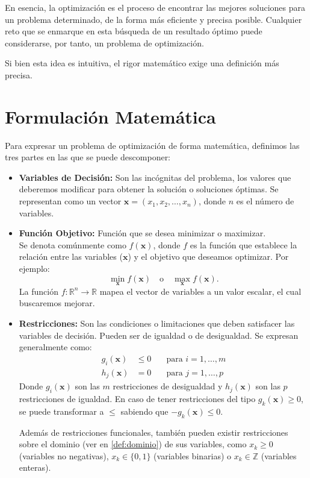 \documentclass[12pt,a4paper]{book}
\begin{document}
En esencia, la optimización es el proceso de encontrar las mejores soluciones para un problema determinado, de la forma más eficiente y precisa posible.
Cualquier reto que se enmarque en esta búsqueda de un resultado óptimo puede considerarse, por tanto, un problema de optimización.

Si bien esta idea es intuitiva, el rigor matemático exige una definición más precisa.

\section{Formulación Matemática}

Para expresar un problema de optimización de forma matemática, definimos las tres partes en las que se puede descomponer:

\begin{itemize}
    \item \textbf{Variables de Decisión:} Son las incógnitas del problema, los valores que deberemos modificar para obtener la solución o soluciones óptimas. Se representan como un vector $\mathbf{x} = (x_1, x_2, \ldots, x_n)$, donde $n$ es el número de variables.

    \item \textbf{Función Objetivo:} Función que se desea minimizar o maximizar.\\
    Se denota comúnmente como $f(\mathbf{x})$, donde $f$ es la función que establece la relación entre las variables ($\mathbf{x}$) y el objetivo que deseamos optimizar.
    Por ejemplo:
    $$ \min_{\mathbf{x}} f(\mathbf{x}) \quad \text{o} \quad \max_{\mathbf{x}} f(\mathbf{x}) .$$
    La función $f: \mathbb{R}^n \to \mathbb{R}$ mapea el vector de variables a un valor escalar, el cual buscaremos mejorar.

    \item \textbf{Restricciones:} Son las condiciones o limitaciones que deben satisfacer las variables de decisión. Pueden ser de igualdad o de desigualdad. Se expresan generalmente como:
    \begin{align*}
        g_i(\mathbf{x}) &\le 0 & \quad \text{para } i = 1, \ldots, m \\
        h_j(\mathbf{x}) &= 0 & \quad \text{para } j = 1, \ldots, p
    \end{align*}
    Donde $g_i(\mathbf{x})$ son las $m$ restricciones de desigualdad y $h_j(\mathbf{x})$ son las $p$ restricciones de igualdad.
    En caso de tener restricciones del tipo $g_k(\mathbf{x})\geq0$, se puede transformar a $\leq$ sabiendo que $-g_k(\mathbf{x}) \leq 0$.
    
    Además de restricciones funcionales, también pueden existir restricciones sobre el dominio (ver en \ref{def:dominio}) de sus variables, como $x_k \ge 0$ (variables no negativas),  $x_k \in \{0,1\}$ (variables binarias) o $x_k \in \mathbb{Z}$ (variables enteras).
\end{itemize}
\end{document}
